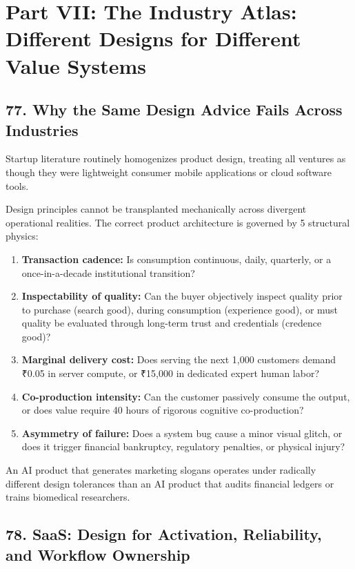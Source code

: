 \section*{Part VII: The Industry Atlas: Different Designs for Different Value Systems}

\subsection*{77. Why the Same Design Advice Fails Across Industries}

Startup literature routinely homogenizes product design, treating all ventures as though they were lightweight consumer mobile applications or cloud software tools.

Design principles cannot be transplanted mechanically across divergent operational realities. The correct product architecture is governed by 5 structural physics:
\begin{enumerate}
    \item \textbf{Transaction cadence:} Is consumption continuous, daily, quarterly, or a once-in-a-decade institutional transition?
    \item \textbf{Inspectability of quality:} Can the buyer objectively inspect quality prior to purchase (search good), during consumption (experience good), or must quality be evaluated through long-term trust and credentials (credence good)?
    \item \textbf{Marginal delivery cost:} Does serving the next 1,000 customers demand ₹0.05 in server compute, or ₹15,000 in dedicated expert human labor?
    \item \textbf{Co-production intensity:} Can the customer passively consume the output, or does value require 40 hours of rigorous cognitive co-production?
    \item \textbf{Asymmetry of failure:} Does a system bug cause a minor visual glitch, or does it trigger financial bankruptcy, regulatory penalties, or physical injury?
\end{enumerate}

An AI product that generates marketing slogans operates under radically different design tolerances than an AI product that audits financial ledgers or trains biomedical researchers.

\subsection*{78. SaaS: Design for Activation, Reliability, and Workflow Ownership}

